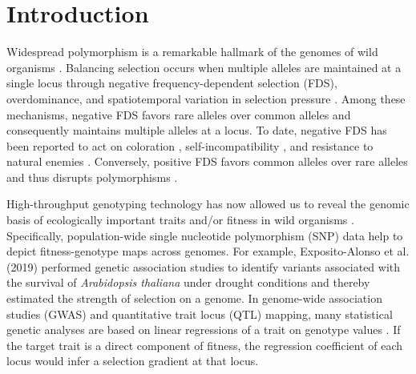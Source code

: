 \documentclass[12pt,]{article}
\begin{document}
\section{Introduction}
Widespread polymorphism is a remarkable hallmark of the genomes of wild organisms \citep{durham_genome-wide_2014, alonso-blanco_1135_2016, lewin2018earth}. Balancing selection occurs when multiple alleles are maintained at a single locus through negative frequency-dependent selection (FDS), overdominance, and spatiotemporal variation in selection pressure \citep{hedrick2007balancing}. Among these mechanisms, negative FDS favors rare alleles over common alleles and consequently maintains multiple alleles at a locus. To date, negative FDS has been reported to act on coloration \citep{gigord2001negative, takahashi2010negative, le2015evolutionary, nosil2018natural}, self-incompatibility \citep{llaurens2008does, joly2011migration}, and resistance to natural enemies \citep{antonovics1984experimental, brunet2000disease, sato2017herbivore}. Conversely, positive FDS favors common alleles over rare alleles and thus disrupts polymorphisms \citep{borer2010positive, garrido2016effect}.

High-throughput genotyping technology has now allowed us to reveal the genomic basis of ecologically important traits and/or fitness in wild organisms \citep{durham_genome-wide_2014, fisher_genetic_2016, nosil2018natural, exposito2019natural, tsuchimatsu2020adaptive}. Specifically, population-wide single nucleotide polymorphism (SNP) data help to depict fitness-genotype maps across genomes. For example, Exposito-Alonso et al. (2019) performed genetic association studies to identify variants associated with the survival of \textit{Arabidopsis thaliana} under drought conditions and thereby estimated the strength of selection on a genome. In genome-wide association studies (GWAS) and quantitative trait locus (QTL) mapping, many statistical genetic analyses are based on linear regressions of a trait on genotype values \citep{broman2009single, gondro2013genome}. If the target trait is a direct component of fitness, the regression coefficient of each locus would infer a selection gradient \citep{lande1983measurement} at that locus.
\end{document}
